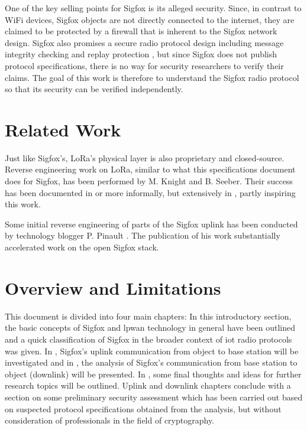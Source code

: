 One of the key selling points for Sigfox is its alleged security.
Since, in contrast to WiFi devices, Sigfox objects are not directly connected to the internet, they are claimed to be protected by a firewall that is inherent to the Sigfox network design.
Sigfox also promises a secure radio protocol design including message integrity checking and replay protection \cite{sigfox_security_whitepaper}, but since Sigfox does not publish protocol specifications, there is no way for security researchers to verify their claims.
The goal of this work is therefore to understand the Sigfox radio protocol so that its security can be verified independently.

\FloatBarrier
\section{Related Work}
Just like Sigfox's, LoRa's physical layer is also proprietary and closed-source.
Reverse engineering work on LoRa, similar to what this specifications document does for Sigfox, has been performed by M. Knight and B. Seeber.
Their success has been documented in \cite{lora_gr} or more informally, but extensively in \cite{lora_poc}, partly inspiring this work.

Some initial reverse engineering of parts of the Sigfox uplink has been conducted by technology blogger P. Pinault \cite{disk91radioprotocol}.
The publication of his work substantially accelerated work on the open Sigfox stack.

\vspace{-0.2cm}
\FloatBarrier
\section{Overview and Limitations}
\vspace{-0.2cm}
This document is divided into four main chapters:
In this introductory section, the basic concepts of Sigfox and \gls{lpwan} technology in general have been outlined and a quick classification of Sigfox in the broader context of \gls{iot} radio protocols was given.
In , Sigfox's uplink communication from object to base station will be investigated and in , the analysis of Sigfox's communication from base station to object (downlink) will be presented.
In , some final thoughts and ideas for further research topics will be outlined.
Uplink and downlink chapters conclude with a section on some preliminary security assessment which has been carried out based on suspected protocol specifications obtained from the analysis, but without consideration of professionals in the field of cryptography. 

